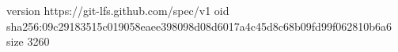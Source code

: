 version https://git-lfs.github.com/spec/v1
oid sha256:09c29183515c019058eaee398098d08d6017a4c45d8c68b09fd99f062810b6a6
size 3260
